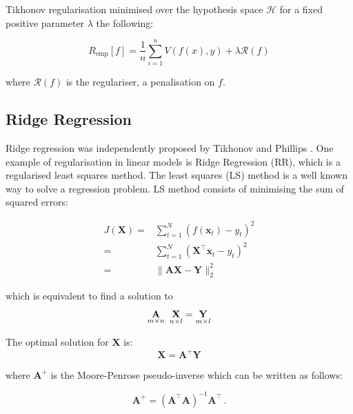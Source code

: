 Tikhonov regularisation minimised over the hypothesis space $\mathcal{H}$ for a
fixed positive parameter $\lambda$ the following:

\begin{equation} 
\label{eq:rerm}
R_{\text{emp}}[f] = \frac{1}{n} \sum_{i=1}^n V(f(x),y) + \lambda \mathcal{R}(f)
\end{equation}

\noindent where $\mathcal{R}(f)$ is the regulariser, a penalisation on $f$.

\subsection{Ridge Regression}

Ridge regression was independently proposed by Tikhonov \cite{tikhonov1963} and
Phillips \cite{phillips1962}. 
One example of regularisation in linear models is Ridge Regression (RR), which is a regularised least squares method.
The least squares (LS) method is a well known way to solve a regression
problem. 
LS method consists of minimising the sum of squared errors:

\begin{eqnarray*}
\label{eq:lsm}
 J(\mathbf{X}) =& \displaystyle \sum_{t=1}^N (f(\mathbf{x}_t)-y_t)^2 \\
 =&\displaystyle \sum_{t=1}^N (\mathbf{\mathbf{X}}^\top {\mathbf{x}}_t-y_t)^2 \\
 =& \| \mathbf{A}\mathbf{\mathbf{X}} - \mathbf{Y} \|_2^2 
\end{eqnarray*}

\noindent which is equivalent to find a solution to 
\begin{equation}
\label{eq:regproblem}
\underset{m \times n}{\mathbf{A}} \enskip \underset{n \times
l}{\mathbf{\mathbf{X}}} = \underset{m \times l}{\mathbf{Y}}
\end{equation}

The optimal solution for $\mathbf{\mathbf{X}}$ is:
\begin{equation}
\label{eq:MP}
\mathbf{\mathbf{X}}= \mathbf{A}^+ \mathbf{Y}
\end{equation}

\noindent where $\mathbf{A}^+$ is the Moore-Penrose pseudo-inverse
which can be written as follows: 

\begin{equation}
\label{eq:pseudoinverse}
\mathbf{A}^+= (\mathbf{A}^\top \mathbf{A})^{-1}\mathbf{A}^\top \, .
\end{equation}

